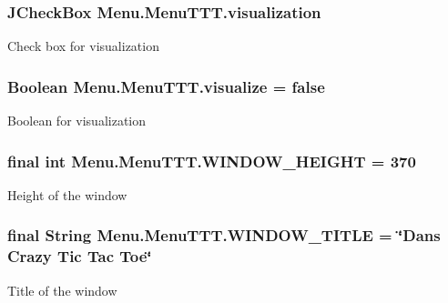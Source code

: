 \subsubsection[{visualization}]{\setlength{\rightskip}{0pt plus 5cm}J\+Check\+Box Menu.\+Menu\+T\+T\+T.\+visualization\hspace{0.3cm}{\ttfamily [private]}}\label{class_menu_1_1_menu_t_t_t_a611b82f2267f9ccb007b1ee5744e3088}
Check box for visualization \hypertarget{class_menu_1_1_menu_t_t_t_a9d69fa1e5f80800c37ee3c47925f3f14}{}
\subsubsection[{visualize}]{\setlength{\rightskip}{0pt plus 5cm}Boolean Menu.\+Menu\+T\+T\+T.\+visualize = false\hspace{0.3cm}{\ttfamily [private]}}\label{class_menu_1_1_menu_t_t_t_a9d69fa1e5f80800c37ee3c47925f3f14}
Boolean for visualization \hypertarget{class_menu_1_1_menu_t_t_t_a5f9a3dacb45dd6f4f1749aa86d1b1154}{}
\subsubsection[{W\+I\+N\+D\+O\+W\+\_\+\+H\+E\+I\+G\+H\+T}]{\setlength{\rightskip}{0pt plus 5cm}final int Menu.\+Menu\+T\+T\+T.\+W\+I\+N\+D\+O\+W\+\_\+\+H\+E\+I\+G\+H\+T = 370\hspace{0.3cm}{\ttfamily [private]}}\label{class_menu_1_1_menu_t_t_t_a5f9a3dacb45dd6f4f1749aa86d1b1154}
Height of the window \hypertarget{class_menu_1_1_menu_t_t_t_a415b411bb82c4159d053e2e3a87a9061}{}
\subsubsection[{W\+I\+N\+D\+O\+W\+\_\+\+T\+I\+T\+L\+E}]{\setlength{\rightskip}{0pt plus 5cm}final String Menu.\+Menu\+T\+T\+T.\+W\+I\+N\+D\+O\+W\+\_\+\+T\+I\+T\+L\+E = \char`\"{}Dans Crazy Tic Tac Toe\char`\"{}\hspace{0.3cm}{\ttfamily [private]}}\label{class_menu_1_1_menu_t_t_t_a415b411bb82c4159d053e2e3a87a9061}
Title of the window \hypertarget{class_menu_1_1_menu_t_t_t_a07f18d5ed40cd020290f7cb16ffadca8}{}
